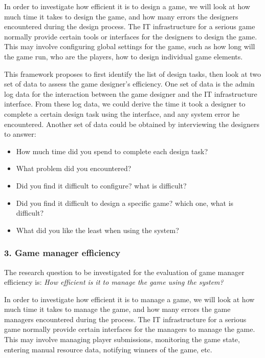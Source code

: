 \documentclass{sigchi}
\begin{document}
In order to investigate how efficient it is to design a game, we will look at how much time it takes to design the game, and how many errors the designers encountered during the design process.
The IT infrastructure for a serious game normally provide certain tools or interfaces for the designers to design the game. This may involve configuring global settings for the game, such as how long will the game run, who are the players, how to design individual game elements.

This framework proposes to first identify the list of design tasks, then look at two set of data to assess the game designer's efficiency. One set of data is the admin log data for the interaction between the game designer and the IT infrastructure interface. From these log data, we could derive the time it took a designer to complete a certain design task using the interface, and any system error he encountered. Another set of data could be obtained by interviewing the designers to answer:
\begin{itemize}
    \item How much time did you spend to complete each design task?
    \item What problem did you encountered?
    \item Did you find it difficult to configure? what is difficult?
    \item Did you find it difficult to design a specific game? which one, what is difficult?
    \item What did you like the least when using the system?
\end{itemize}

\subsubsection{3. Game manager efficiency}
The research question to be investigated for the evaluation of game manager efficiency is: \emph{How efficient is it to manage the game using the system?}

In order to investigate how efficient it is to manage a game, we will look at how much time it takes to manage the game, and how many errors the game managers encountered during the process.
The IT infrastructure for a serious game normally provide certain interfaces for the managers to manage the game. This may involve managing player submissions, monitoring the game state, entering manual resource data, notifying winners of the game, etc.
\end{document}
